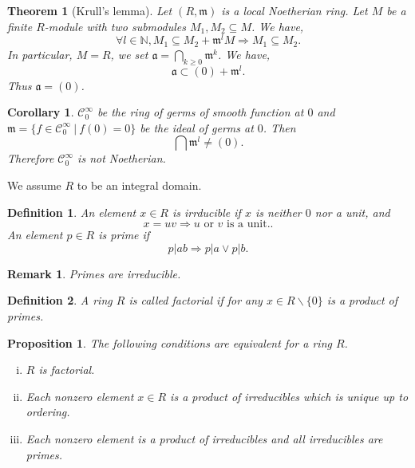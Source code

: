 \documentclass{article}
\newtheorem{theorem}{Theorem} [section]
\newtheorem{proposition}{Proposition}[section]
\newtheorem{definition}{Definition}[section]
\newtheorem{remark}{Remark}[section]
\newtheorem{corollary}{Corollary} [section]
\newcommand{\N}[0]{\mathbb{N}}
\newcommand{\sep}[0]{\:|\:}
\begin{document}
\begin{theorem}[Krull's lemma]
  Let $(R,\mathfrak{m})$ is a local Noetherian ring. Let $M$ be a finite $R$-module with two submodules $M_1,M_2\subseteq M$. We have,
  \begin{equation*}
    \forall l\in\N,M_1\subseteq M_2 + \mathfrak{m}^lM \Rightarrow M_1\subseteq M_2.
  \end{equation*}
  In particular, $M=R$, we set $\mathfrak{a} = \bigcap_{k\geq 0}\mathfrak{m}^k$. We have,
  \begin{equation*}
    \mathfrak{a}\subset (0)+\mathfrak{m}^l.
  \end{equation*}
  Thus $\mathfrak{a} = (0)$.
\end{theorem}

\begin{corollary}
  $\mathcal{C}_0^\infty$ be the ring of germs of smooth function at $0$ and $\mathfrak{m}=\{f\in\mathcal{C}^\infty_0\sep f(0) = 0\}$ be the ideal of germs at $0$. Then 
  \begin{equation*}
    \bigcap\mathfrak{m}^l \not=(0).
  \end{equation*}
  Therefore $\mathcal{C}^\infty_0$ is not Noetherian.
\end{corollary}

We assume $R$ to be an integral domain.

\begin{definition}
  An element $x\in R$ is irrducible if $x$ is neither $0$ nor a unit, and 
  \begin{equation*}
    x = uv\Rightarrow \text{$u$ or $v$ is a unit.}.
  \end{equation*}
  An element $p\in R$ is prime if 
  \begin{equation*}
    p|ab\Rightarrow p|a \lor p|b.
  \end{equation*}
\end{definition}

\begin{remark}
  Primes are irreducible.
\end{remark}

\begin{definition}
  A ring $R$ is called factorial if for any $x\in R\backslash\{0\}$ is a product of primes.
\end{definition}
\begin{proposition}
  \label{prop_3_5}
    The following conditions are equivalent for a ring $R$.
    \begin{enumerate}[i).]
      \item $R$ is factorial.
      \item Each nonzero element $x\in R$ is a product of irreducibles which is unique up to ordering.
      \item Each nonzero element is a product of irreducibles and all irreducibles are primes.
    \end{enumerate}
\end{proposition}
\end{document}

